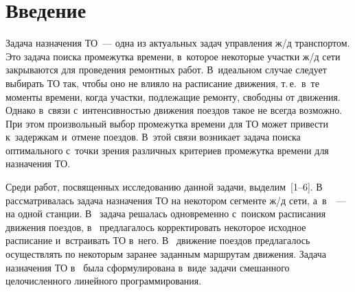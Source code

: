       


\vspace*{-1pt}



\thispagestyle{headings}

\begin{multicols}{2}

\label{st\stat}


       
\section{Введение}

  Задача назначения ТО~--- одна из актуальных задач управления ж/д 
транспортом. Это задача поиска промежутка времени, в~которое некоторые 
участки ж/д сети закрываются для проведения ремонтных работ. В~идеальном 
случае следует выбирать ТО так, чтобы оно не влияло на расписание движения, 
т.\,е.\ в~те моменты времени, когда участки, подлежащие ремонту, свободны от 
движения. Однако в~связи с~интенсивностью движения поездов такое не всегда 
возможно. При этом произвольный выбор промежутка времени для ТО может 
при\-вес\-ти к~задержкам и~отмене поездов. В~этой связи возникает задача поиска 
оптимального с~точки зрения различных критериев промежутка времени для 
назначения ТО.
  
  Среди работ, посвященных исследованию данной задачи, выделим~[1--6]. 
В~\cite{1-bos, 2-bos, 3-bos, 4-bos, 5-bos} рассматривалась задача назначения ТО на 
некотором сегменте ж/д сети, а~в~\cite{6-bos}~--- на одной станции.  
В~\cite{1-bos, 3-bos, 5-bos} задача решалась одновременно с~поиском расписания\linebreak 
движения поездов, в~\cite{2-bos, 4-bos, 6-bos} предлагалось корректировать 
некоторое исходное расписание и~встраивать ТО в~него. В~\cite{1-bos, 3-bos} 
движение поездов предлагалось осуществлять по некоторым заранее \mbox{заданным} 
маршрутам движения. Задача назначения ТО в~\cite{1-bos, 5-bos, 6-bos} была 
сформулирована в~виде задачи смешанного целочисленного линейного 
программирования.
  

\end{multicols}
